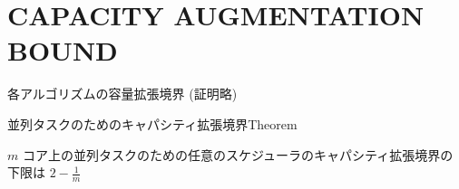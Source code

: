 
\section{CAPACITY AUGMENTATION BOUND}
\label{sec: CAPACITY AUGMENTATION BOUND}

\begin{frame}{各アルゴリズムの容量拡張境界 (証明略)}
\end{frame}

\begin{frame}[label=theorem1]{並列タスクのためのキャパシティ拡張境界Theorem}
    \begin{theorem}[]
        $m$ コア上の並列タスクのための任意のスケジューラのキャパシティ拡張境界の下限は $2-\frac{1}{m}$
    \end{theorem}
\end{frame}
